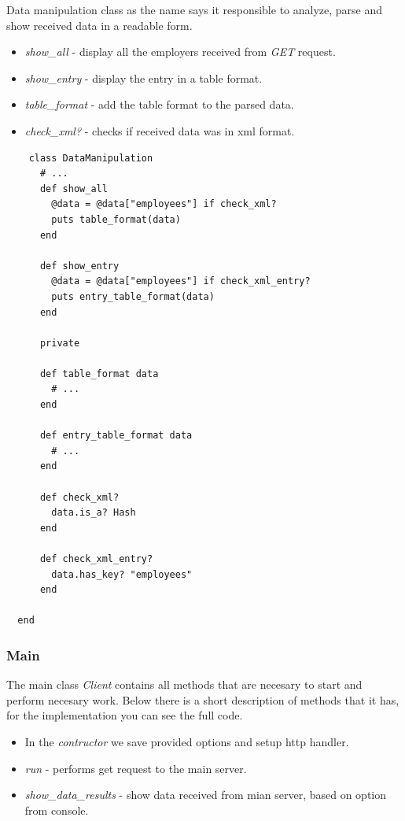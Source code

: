 \documentclass[12pt]{article}
\begin{document}
    Data manipulation class as the name says it responsible to analyze,
    parse and show received data in a readable form.

    \newpage

    \begin{itemize}
      \renewcommand{\labelitemi}{$\circ$}
      \item \textit{show\_all} - display all the employers received from \textit{GET} request.
      \item \textit{show\_entry}  - display the entry in a table format.
      \item \textit{table\_format} - add the table format to the parsed data.
      \item \textit{check\_xml?} - checks if received data was in xml format.
    \end{itemize}

    \begin{lstlisting}
    class DataManipulation
      # ... 
      def show_all
        @data = @data["employees"] if check_xml?
        puts table_format(data)
      end

      def show_entry
        @data = @data["employees"] if check_xml_entry?
        puts entry_table_format(data)
      end

      private

      def table_format data
        # ... 
      end

      def entry_table_format data
        # ... 
      end

      def check_xml?
        data.is_a? Hash
      end

      def check_xml_entry?
        data.has_key? "employees"
      end

  end
    \end{lstlisting}

    \subsubsection{Main}

    The main class \textit{Client} contains all methods that are necesary to start and perform necesary
    work. Below there is a short description of methods that it has, for the implementation you can see the full code.

    \begin{itemize}
      \renewcommand{\labelitemi}{$\circ$}
      \item In the \textit{contructor} we save provided options and setup http handler.
      \item \textit{run} - performs get request to the main server.
      \item \textit{show\_data\_results} - show data received from mian server, based on option from console.
    \end{itemize}
\end{document}
